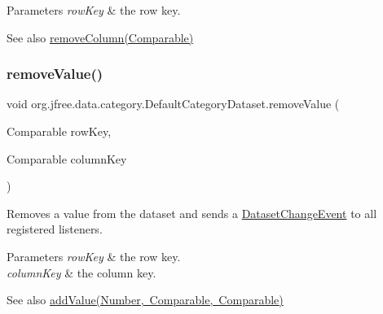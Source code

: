 \begin{DoxyParams}{Parameters}
{\em row\+Key} & the row key.\\
\hline
\end{DoxyParams}
\begin{DoxySeeAlso}{See also}
\mbox{\hyperlink{classorg_1_1jfree_1_1data_1_1category_1_1_default_category_dataset_a6ba7263d721920a0981bf339ad9bea7b}{remove\+Column(\+Comparable)}} 
\end{DoxySeeAlso}
\mbox{\label{classorg_1_1jfree_1_1data_1_1category_1_1_default_category_dataset_adc052d373a3e65d0a9c955cb79fc2283}} 
\subsubsection{\texorpdfstring{remove\+Value()}{removeValue()}}
{\footnotesize\ttfamily void org.\+jfree.\+data.\+category.\+Default\+Category\+Dataset.\+remove\+Value (\begin{DoxyParamCaption}\item[{Comparable}]{row\+Key,  }\item[{Comparable}]{column\+Key }\end{DoxyParamCaption})}

Removes a value from the dataset and sends a \mbox{\hyperlink{}{Dataset\+Change\+Event}} to all registered listeners.


\begin{DoxyParams}{Parameters}
{\em row\+Key} & the row key. \\
\hline
{\em column\+Key} & the column key.\\
\hline
\end{DoxyParams}
\begin{DoxySeeAlso}{See also}
\mbox{\hyperlink{classorg_1_1jfree_1_1data_1_1category_1_1_default_category_dataset_a69d2a96abc039f088e63b39fcaa4cbe1}{add\+Value(\+Number, Comparable, Comparable)}} 
\end{DoxySeeAlso}
\mbox{\label{classorg_1_1jfree_1_1data_1_1category_1_1_default_category_dataset_afbcef15d23ebe245f352d0969f0f0460}} 
